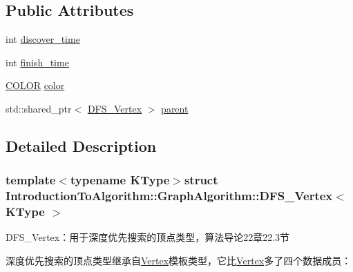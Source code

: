 \subsection*{Public Attributes}
\begin{DoxyCompactItemize}
\item 
int \hyperlink{struct_introduction_to_algorithm_1_1_graph_algorithm_1_1_d_f_s___vertex_aab1b292c1d228d57ef3d20af908fe2cf}{discover\+\_\+time}
\item 
int \hyperlink{struct_introduction_to_algorithm_1_1_graph_algorithm_1_1_d_f_s___vertex_aa0f17c70784c1dcc199487e519814e61}{finish\+\_\+time}
\item 
\hyperlink{struct_introduction_to_algorithm_1_1_graph_algorithm_1_1_d_f_s___vertex_a9455444fdfb1b29f24c1d27e74e7c124}{C\+O\+L\+O\+R} \hyperlink{struct_introduction_to_algorithm_1_1_graph_algorithm_1_1_d_f_s___vertex_a9111c3d35ad67867402564643493655f}{color}
\item 
std\+::shared\+\_\+ptr$<$ \hyperlink{struct_introduction_to_algorithm_1_1_graph_algorithm_1_1_d_f_s___vertex}{D\+F\+S\+\_\+\+Vertex} $>$ \hyperlink{struct_introduction_to_algorithm_1_1_graph_algorithm_1_1_d_f_s___vertex_ad243c81b3c0705a136b6a1e5debdb6ed}{parent}
\end{DoxyCompactItemize}


\subsection{Detailed Description}
\subsubsection*{template$<$typename K\+Type$>$struct Introduction\+To\+Algorithm\+::\+Graph\+Algorithm\+::\+D\+F\+S\+\_\+\+Vertex$<$ K\+Type $>$}

D\+F\+S\+\_\+\+Vertex：用于深度优先搜索的顶点类型，算法导论22章22.3节 

深度优先搜索的顶点类型继承自{\ttfamily \hyperlink{struct_introduction_to_algorithm_1_1_graph_algorithm_1_1_vertex}{Vertex}}模板类型，它比{\ttfamily \hyperlink{struct_introduction_to_algorithm_1_1_graph_algorithm_1_1_vertex}{Vertex}}多了四个数据成员：


